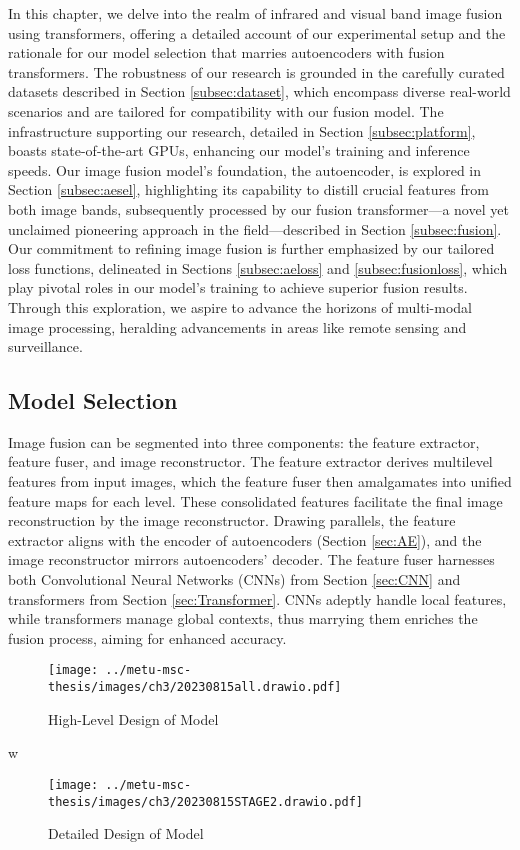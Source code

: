 \label{chp:b3}

In this chapter, we delve into the realm of infrared and visual band image fusion using transformers, offering a detailed account of our experimental setup and the rationale for our model selection that marries autoencoders with fusion transformers. The robustness of our research is grounded in the carefully curated datasets described in Section \ref{subsec:dataset}, which encompass diverse real-world scenarios and are tailored for compatibility with our fusion model. The infrastructure supporting our research, detailed in Section \ref{subsec:platform}, boasts state-of-the-art GPUs, enhancing our model's training and inference speeds. Our image fusion model's foundation, the autoencoder, is explored in Section \ref{subsec:aesel}, highlighting its capability to distill crucial features from both image bands, subsequently processed by our fusion transformer—a novel yet unclaimed pioneering approach in the field—described in Section \ref{subsec:fusion}. Our commitment to refining image fusion is further emphasized by our tailored loss functions, delineated in Sections \ref{subsec:aeloss} and \ref{subsec:fusionloss}, which play pivotal roles in our model's training to achieve superior fusion results. Through this exploration, we aspire to advance the horizons of multi-modal image processing, heralding advancements in areas like remote sensing and surveillance.
\subsection{Model Selection} \label{sec:model}

Image fusion can be segmented into three components: the feature extractor, feature fuser, and image reconstructor. The feature extractor derives multilevel features from input images, which the feature fuser then amalgamates into unified feature maps for each level. These consolidated features facilitate the final image reconstruction by the image reconstructor. Drawing parallels, the feature extractor aligns with the encoder of autoencoders (Section \ref{sec:AE}), and the image reconstructor mirrors autoencoders' decoder. The feature fuser harnesses both Convolutional Neural Networks (CNNs) from Section \ref{sec:CNN} and transformers from Section \ref{sec:Transformer}. CNNs adeptly handle local features, while transformers manage global contexts, thus marrying them enriches the fusion process, aiming for enhanced accuracy.
\begin{figure}[htbp]
    \centering
    \texttt{[image: ../metu-msc-thesis/images/ch3/20230815all.drawio.pdf]}
    \caption{High-Level Design of Model}
    \label{fig:ch3:highlevel}
\end{figure}
w
\begin{figure}[htbp]
    \centering
    \texttt{[image: ../metu-msc-thesis/images/ch3/20230815STAGE2.drawio.pdf]}
    \caption{Detailed Design of Model}
    \label{fig:ch3:highlevel2}
\end{figure}


